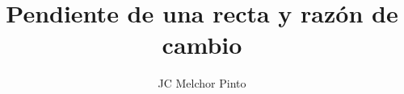 \documentclass[12pt,addpoints,answers]{guia}
\title{Pendiente de una recta y razón de cambio}
\author{JC Melchor Pinto}
\begin{document}
\INFO%
\begin{questions}
    \questionboxed[10]{}
    \questionboxed[10]{}
    \questionboxed[10]{}
    \questionboxed[10]{}
\end{questions}
\end{document}
